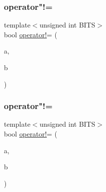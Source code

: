 \mbox{\label{classbase__uint_a3cc3bccf252004fbbd2b96dc769378e7}} 
\subsubsection{\texorpdfstring{operator"!=}{operator!=}\hspace{0.1cm}{\footnotesize\ttfamily [1/2]}}
{\footnotesize\ttfamily template$<$unsigned int B\+I\+TS$>$ \\
bool \mbox{\hyperlink{classbase__uint_afbcdb1cf849d37272b4e7d4fabf1192b}{operator!}}= (\begin{DoxyParamCaption}\item[{const \mbox{\hyperlink{classbase__uint}{base\+\_\+uint}}$<$ B\+I\+TS $>$ \&}]{a,  }\item[{const \mbox{\hyperlink{classbase__uint}{base\+\_\+uint}}$<$ B\+I\+TS $>$ \&}]{b }\end{DoxyParamCaption})\hspace{0.3cm}{\ttfamily [friend]}}

\mbox{\label{classbase__uint_ab7b366cc0883f25fa57fb09d4bc33807}} 
\subsubsection{\texorpdfstring{operator"!=}{operator!=}\hspace{0.1cm}{\footnotesize\ttfamily [2/2]}}
{\footnotesize\ttfamily template$<$unsigned int B\+I\+TS$>$ \\
bool \mbox{\hyperlink{classbase__uint_afbcdb1cf849d37272b4e7d4fabf1192b}{operator!}}= (\begin{DoxyParamCaption}\item[{const \mbox{\hyperlink{classbase__uint}{base\+\_\+uint}}$<$ B\+I\+TS $>$ \&}]{a,  }\item[{uint64\+\_\+t}]{b }\end{DoxyParamCaption})\hspace{0.3cm}{\ttfamily [friend]}}

\mbox{\label{classbase__uint_a7cc93af608b4d2b8e45f8a18bb085cf0}} 
